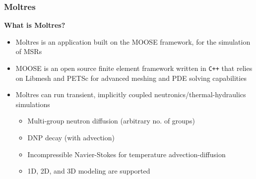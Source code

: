 \begin{frame}
	\frametitle{Moltres}
		\textbf{What is Moltres?}
		\begin{itemize}
			\item Moltres \cite{lindsay_introduction_2018} is an application
			built on the \gls{MOOSE} framework, for the simulation of \glspl{MSR}
			\item \gls{MOOSE} \cite{gaston_moose:_2009} is an open source finite
			element framework written in \texttt{C++} that
			relies on Libmesh and PETSc for advanced meshing and PDE solving
			capabilities
			\item Moltres can run transient, implicitly coupled
			neutronics/thermal-hydraulics simulations
			\begin{itemize}
				\item Multi-group neutron diffusion (arbitrary no. of groups)
				\item \gls{DNP} decay (with advection)
				\item Incompressible Navier-Stokes for temperature
				advection-diffusion
				\item 1D, 2D, and 3D modeling are supported
			\end{itemize}
		\end{itemize}
\end{frame}
